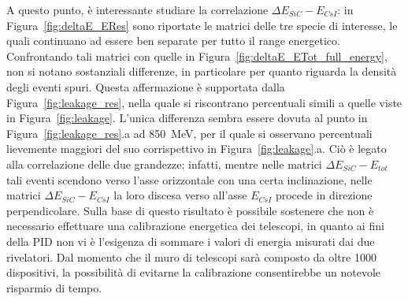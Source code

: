 A questo punto, è interessante studiare la correlazione $\Delta E_{SiC} - E_{CsI}$: in Figura~\ref{fig:deltaE_ERes} sono riportate le matrici delle tre specie di interesse, le quali continuano ad essere ben separate per tutto il range energetico. 
Confrontando tali matrici con quelle in Figura~\ref{fig:deltaE_ETot_full_energy}, non si notano sostanziali differenze, in particolare per quanto riguarda la densità degli eventi spuri.
Questa affermazione è supportata dalla Figura~\ref{fig:leakage_res}, nella quale si riscontrano percentuali simili a quelle viste in Figura~\ref{fig:leakage}.
L'unica differenza sembra essere dovuta al punto in Figura~\ref{fig:leakage_res}.a ad 850~MeV, per il quale si osservano percentuali lievemente maggiori del suo corrispettivo in Figura~\ref{fig:leakage}.a. 
Ciò è legato alla correlazione delle due grandezze;
infatti, mentre nelle matrici $\Delta E_{SiC} - E_{tot}$ tali eventi scendono verso l'asse orizzontale con una certa inclinazione, nelle matrici $\Delta E_{SiC} - E_{CsI}$ la loro discesa verso all'asse $E_{CsI}$ procede in direzione perpendicolare. 
Sulla base di questo risultato è possibile sostenere che non è necessario effettuare una calibrazione energetica dei telescopi, in quanto ai fini della PID non vi è l'esigenza di sommare i valori di energia misurati dai due rivelatori.
Dal momento che il muro di telescopi sarà composto da oltre 1000 dispositivi, la possibilità di evitarne la calibrazione consentirebbe un notevole risparmio di tempo.



